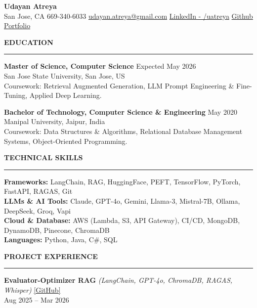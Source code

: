 \documentclass[letterpaper,10.5pt]{extarticle}
\newcommand{\resumesection}[1]{%
    \vspace{6pt}%
    \noindent\textbf{#1}\vspace{-5pt}%
    \\\noindent\rule{\textwidth}{0.5pt}%
    \vspace{1pt}%
}
\begin{document}
\begin{center}
    {\LARGE\textbf{Udayan Atreya}}\\[3pt]
    {\fontsize{11}{13.2}\selectfont
    San Jose, CA \textbar{} 669-340-6033 \textbar{}
    \href{mailto:udayan.atreya@gmail.com}{udayan.atreya@gmail.com} \textbar{}
    \href{https://www.linkedin.com/in/uatreya/}{LinkedIn - /uatreya} \textbar{}
    \href{https://github.com/slowloris-98/}{Github} \textbar{}
    \href{https://udayan-atreya.vercel.app/}{Portfolio}}
\end{center}

\resumesection{EDUCATION}

\noindent\textbf{Master of Science, Computer Science} \hfill Expected May 2026\\
San Jose State University, San Jose, US\\
Coursework: Retrieval Augmented Generation, LLM Prompt Engineering \& Fine-Tuning, Applied Deep Learning.

\vspace{5pt}

\noindent\textbf{Bachelor of Technology, Computer Science \& Engineering} \hfill May 2020\\
Manipal University, Jaipur, India\\
Coursework: Data Structures \& Algorithms, Relational Database Management Systems, Object-Oriented Programming.

\resumesection{TECHNICAL SKILLS}

\noindent\textbf{Frameworks:} LangChain, RAG, HuggingFace, PEFT, TensorFlow, PyTorch, FastAPI, RAGAS, Git\\
\noindent\textbf{LLMs \& AI Tools:} Claude, GPT-4o, Gemini, Llama-3, Mistral-7B, Ollama, DeepSeek, Groq, Vapi\\
\noindent\textbf{Cloud \& Database:} AWS (Lambda, S3, API Gateway), CI/CD, MongoDB, DynamoDB, Pinecone, ChromaDB\\
\noindent\textbf{Languages:} Python, Java, C\#, SQL

\resumesection{PROJECT EXPERIENCE}

\noindent\textbf{Evaluator-Optimizer RAG} \textit{(LangChain, GPT-4o, ChromaDB, RAGAS, Whisper)} \hfill \href{https://github.com/slowloris-98/Evaluator-Optimizer-RAG}{[GitHub]}\\
Aug 2025 -- Mar 2026
\end{document}
